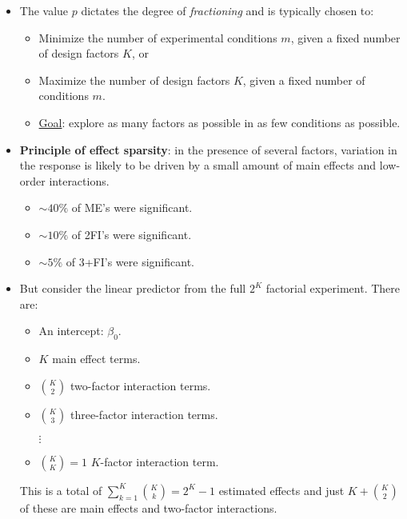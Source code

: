 \begin{itemize}
    \item The value $ p $ dictates the degree of \emph{fractioning} and is typically chosen to:
          \begin{itemize}[$\rightarrow$]
              \item Minimize the number of experimental conditions $ m $, given a fixed number of design factors $ K $, or
              \item Maximize the number of design factors $ K $, given a fixed number of conditions $ m $.
          \end{itemize}
          \begin{itemize}[*]
              \item \underline{Goal}: explore as many factors as possible in as few conditions as possible.
          \end{itemize}
    \item \textbf{Principle of effect sparsity}: in the presence of several factors, variation in the response is likely to
          be driven by a small amount of main effects and low-order interactions.
          \begin{itemize}[$\rightarrow$]
              \item $ \sim 40\% $ of ME's were significant.
              \item $ \sim 10\% $ of 2FI's were significant.
              \item $ \sim 5\% $ of 3+FI's were significant.
          \end{itemize}
    \item But consider the linear predictor from the full $ 2^K $ factorial experiment. There are:
          \begin{itemize}
              \item An intercept: $ \beta_0 $.
              \item $ K $ main effect terms.
              \item $ \binom{K}{2} $ two-factor interaction terms.
              \item $ \binom{K}{3} $ three-factor interaction terms.
              \item[$\vdots$]
              \item $ \binom{K}{K}=1 $ $ K $-factor interaction term.
          \end{itemize}
          This is a total of $ \sum_{k=1}^{K}\binom{K}{k}=2^K-1 $ estimated effects and just $ K+\binom{K}{2} $ of these are main effects
          and two-factor interactions.

\end{itemize}
